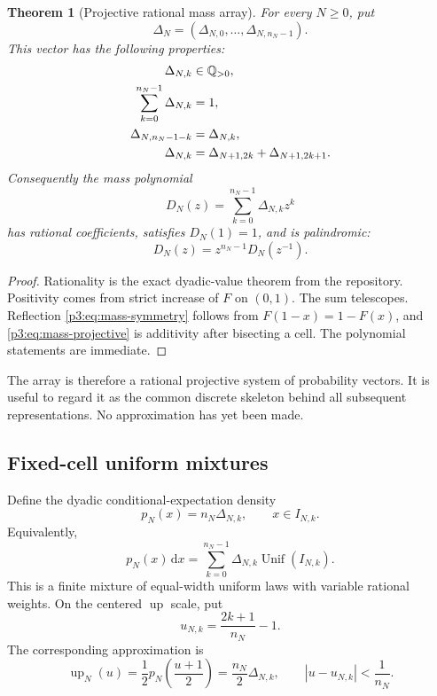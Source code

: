 \documentclass[11pt]{article}
\newtheorem{theorem}{Theorem}[section]
\theoremstyle{definition}
\theoremstyle{remark}
\newcommand{\dd}{\,\mathrm d}
\newcommand{\Up}{\operatorname{up}}
\begin{document}
\begin{theorem}[Projective rational mass array]
\label{p3:thm:projective-masses}
For every $N\ge0$, put
\[
\Delta_N=(\Delta_{N,0},\ldots,\Delta_{N,n_N-1}).
\]
This vector has the following properties:
\begin{align}
 \Delta_{N,k}&\in\mathbb Q_{>0},\label{p3:eq:mass-rational}\\
 \sum_{k=0}^{n_N-1}\Delta_{N,k}&=1,\label{p3:eq:mass-sum}\\
 \Delta_{N,n_N-1-k}&=\Delta_{N,k},\label{p3:eq:mass-symmetry}\\
 \Delta_{N,k}&=\Delta_{N+1,2k}+\Delta_{N+1,2k+1}.
 \label{p3:eq:mass-projective}
\end{align}
Consequently the mass polynomial
\begin{equation}\label{p3:eq:mass-polynomial}
 D_N(z)=\sum_{k=0}^{n_N-1}\Delta_{N,k}z^k
\end{equation}
has rational coefficients, satisfies $D_N(1)=1$, and is palindromic:
\begin{equation}\label{p3:eq:D-palindromic}
 D_N(z)=z^{n_N-1}D_N(z^{-1}).
\end{equation}
\end{theorem}

\begin{proof}
Rationality is the exact dyadic-value theorem from the repository.  Positivity
comes from strict increase of $F$ on $(0,1)$.  The sum telescopes.  Reflection
\eqref{p3:eq:mass-symmetry} follows from $F(1-x)=1-F(x)$, and
\eqref{p3:eq:mass-projective} is additivity after bisecting a cell.  The polynomial
statements are immediate.
\end{proof}

The array is therefore a rational projective system of probability vectors.
It is useful to regard it as the common discrete skeleton behind all subsequent
representations.  No approximation has yet been made.

\subsection{Fixed-cell uniform mixtures}

Define the dyadic conditional-expectation density
\begin{equation}\label{p3:eq:pN-def}
 p_N(x)=n_N\Delta_{N,k},\qquad x\in I_{N,k}.
\end{equation}
Equivalently,
\begin{equation}\label{p3:eq:pN-mixture}
 p_N(x)\dd x
 =\sum_{k=0}^{n_N-1}\Delta_{N,k}
   \operatorname{Unif}(I_{N,k}).
\end{equation}
This is a finite mixture of equal-width uniform laws with variable rational
weights.  On the centered $\Up$ scale, put
\begin{equation}\label{p3:eq:up-cell-centers}
 u_{N,k}=\frac{2k+1}{n_N}-1.
\end{equation}
The corresponding approximation is
\begin{equation}\label{p3:eq:upN-def}
 \Up_N(u)=\frac12p_N\!\left(\frac{u+1}{2}\right)
 =\frac{n_N}{2}\Delta_{N,k},
 \qquad |u-u_{N,k}|<\frac1{n_N}.
\end{equation}
\end{document}
